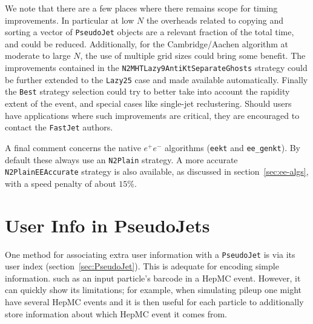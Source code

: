 \documentclass[12pt,a4]{article}
\newcommand{\fastjet}{\texttt{FastJet}\xspace}
\newcommand{\ttt}[1]{{\small\texttt{#1}}}
\newcommand{\order}[1]{{\cal O}\left(#1\right)}
\begin{document}
We note that there are a few places where there remains scope for
timing improvements. 
%
In particular at low $N$ the overheads related to copying and sorting
a vector of \ttt{PseudoJet} objects are a relevant fraction of the
total time, and could be reduced.
%
Additionally, for the Cambridge/Aachen algorithm at moderate to large
$N$, the use of multiple grid sizes could bring some 
benefit.
%
The improvements contained in the \ttt{N2MHTLazy9AntiKtSeparateGhosts}
strategy could be further extended to the \ttt{Lazy25} case and made
available automatically.
%
Finally the \ttt{Best} strategy selection could try to better take
into account the rapidity extent of the event, and special cases like
single-jet reclustering.
% 
%
Should users have applications where such improvements are
critical, they are encouraged to contact the \fastjet authors.

A final comment concerns the native $e^+e^-$ algorithms (\ttt{eekt}
and \ttt{ee\_genkt}).
%
By default these always use an \ttt{N2Plain} strategy.
%
A more accurate \ttt{N2PlainEEAccurate} strategy is also available, as
discussed in section~\ref{sec:ee-algs}, with a speed penalty of about
$15\%$.
 
\section{User Info in PseudoJets}
\label{app:user-info}

One method for associating extra user information with a
\ttt{PseudoJet} is via its user index
(section~\ref{sec:PseudoJet}). This is adequate for encoding simple
information. such as an input particle's barcode in a HepMC
event.
%
However, it can quickly show its limitations; for example, when
simulating pileup one might have several HepMC events and it is then
useful for each particle to additionally store information about which
HepMC event it comes from.
\end{document}
